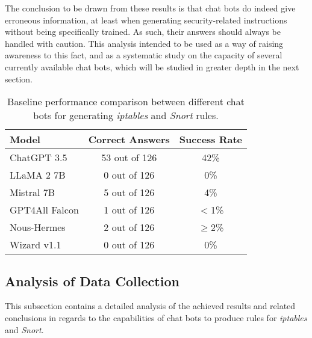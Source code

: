 \documentclass[sigconf]{acmart}
\begin{document}
The conclusion to be drawn from these results is that chat bots do indeed give erroneous information, at least when generating security-related instructions without being specifically trained. As such, their answers should always be handled with caution. This analysis intended to be used as a way of raising awareness to this fact, and as a systematic study on the capacity of several currently available chat bots, which will be studied in greater depth in the next section.
\begin{table}[h]
  \caption{Baseline performance comparison between different chat bots for generating \textit{iptables} and \textit{Snort} rules.}
  \label{tab:baseline}
  \begin{tabular}{@{}lcc@{}}
    \toprule
    \textbf{Model} & \textbf{Correct Answers} & \textbf{Success Rate} \\
    \midrule
    ChatGPT 3.5    & 53 out of 126            & 42\%                  \\
    LLaMA 2 7B     & 0 out of 126             & 0\%                   \\
    Mistral 7B     & 5 out of 126             & 4\%                   \\
    GPT4All Falcon & 1 out of 126             & $<$1\%                \\
    Nous-Hermes    & 2 out of 126             & $\geq$2\%             \\
    Wizard v1.1    & 0 out of 126             & 0\%                   \\
    \bottomrule
  \end{tabular}
\end{table}

\subsection{Analysis of Data Collection}
This subsection contains a detailed analysis of the achieved results and related conclusions in regards to the capabilities of chat bots to produce rules for \textit{iptables} and \textit{Snort}.
\end{document}
